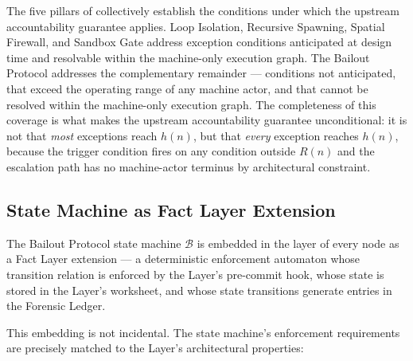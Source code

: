 The five pillars of \bxthree{} collectively establish the conditions under which the upstream accountability guarantee applies. Loop Isolation, Recursive Spawning, Spatial Firewall, and Sandbox Gate address exception conditions anticipated at design time and resolvable within the machine-only execution graph. The Bailout Protocol addresses the complementary remainder --- conditions not anticipated, that exceed the operating range of any machine actor, and that cannot be resolved within the machine-only execution graph. The completeness of this coverage is what makes the upstream accountability guarantee unconditional: it is not that \emph{most} exceptions reach $h(n)$, but that \emph{every} exception reaches $h(n)$, because the trigger condition fires on any condition outside $R(n)$ and the escalation path has no machine-actor terminus by architectural constraint.

\subsection{State Machine as Fact Layer Extension}\label{sec:state-machine-fact-layer}

The Bailout Protocol state machine $\mathcal{B}$ is embedded in the \fact{} layer of every \bxthree{} node as a Fact Layer extension --- a deterministic enforcement automaton whose transition relation is enforced by the \fact{} Layer's pre-commit hook, whose state is stored in the \fact{} Layer's worksheet, and whose state transitions generate entries in the Forensic Ledger.

This embedding is not incidental. The state machine's enforcement requirements are precisely matched to the \fact{} Layer's architectural properties:

